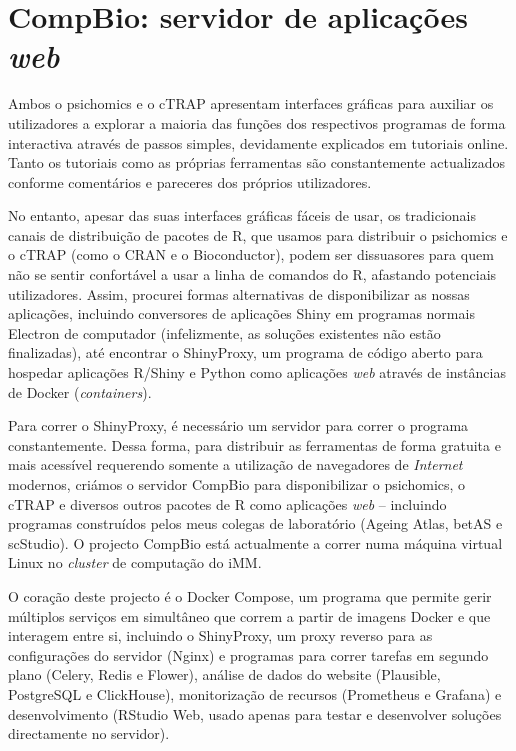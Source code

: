 \section*{CompBio: servidor de aplicações \emph{web}}

Ambos o psichomics e o cTRAP apresentam interfaces gráficas para auxiliar os utilizadores a explorar a maioria das funções dos respectivos programas de forma interactiva através de passos simples, devidamente explicados em tutoriais online. Tanto os tutoriais como as próprias ferramentas são constantemente actualizados conforme comentários e pareceres dos próprios utilizadores.

No entanto, apesar das suas interfaces gráficas fáceis de usar, os tradicionais canais de distribuição de pacotes de R, que usamos para distribuir o psichomics e o cTRAP (como o CRAN e o Bioconductor), podem ser dissuasores para quem não se sentir confortável a usar a linha de comandos do R, afastando potenciais utilizadores. Assim, procurei formas alternativas de disponibilizar as nossas aplicações, incluindo conversores de aplicações Shiny em programas normais Electron de computador (infelizmente, as soluções existentes não estão finalizadas), até encontrar o ShinyProxy, um programa de código aberto para hospedar aplicações R/Shiny e Python como aplicações \emph{web} através de instâncias de Docker (\emph{containers}).

Para correr o ShinyProxy, é necessário um servidor para correr o programa constantemente. Dessa forma, para distribuir as ferramentas de forma gratuita e mais acessível requerendo somente a utilização de navegadores de \emph{Internet} modernos, criámos o servidor CompBio para disponibilizar o psichomics, o cTRAP e diversos outros pacotes de R como aplicações \emph{web} -- incluindo programas construídos pelos meus colegas de laboratório (Ageing Atlas, betAS e scStudio). O projecto CompBio está actualmente a correr numa máquina virtual Linux no \emph{cluster} de computação do iMM.

O coração deste projecto é o Docker Compose, um programa que permite gerir múltiplos serviços em simultâneo que correm a partir de imagens Docker e que interagem entre si, incluindo o ShinyProxy, um proxy reverso para as configurações do servidor (Nginx) e programas para correr tarefas em segundo plano (Celery, Redis e Flower), análise de dados do website (Plausible, PostgreSQL e ClickHouse), monitorização de recursos (Prometheus e Grafana) e desenvolvimento (RStudio Web, usado apenas para testar e desenvolver soluções directamente no servidor).


